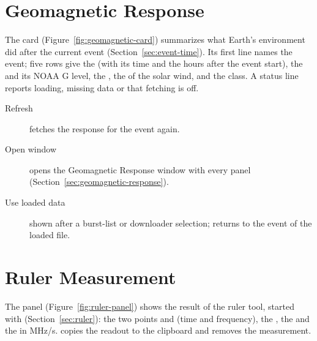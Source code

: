 
\section{Geomagnetic Response}
\label{sec:geomagnetic-card}

The  card (Figure~\ref{fig:geomagnetic-card}) summarizes what
Earth's environment did after the current event (Section~\ref{sec:event-time}). Its first
line names the event; five rows give the  (with its time and the hours after the
event start), the  and its NOAA G level, the , the  of the
solar wind, and the  class. A status line reports loading, missing data or that
fetching is off.
\begin{description}
  \item[Refresh] fetches the response for the event again.
  \item[Open window] opens the Geomagnetic Response window with every panel
    (Section~\ref{sec:geomagnetic-response}).
  \item[Use loaded data] shown after a burst-list or downloader selection; returns to the event
    of the loaded file.
\end{description}


\section{Ruler Measurement}
\label{sec:ruler-panel}

The  panel (Figure~\ref{fig:ruler-panel}) shows the result of the
ruler tool, started with 
(Section~\ref{sec:ruler}): the two points  and  (time and frequency), the
, the  and the  in MHz/s.  copies
the readout to the clipboard and  removes the measurement.

